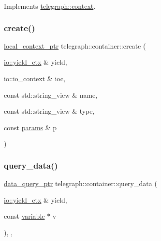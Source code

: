 Implements \hyperlink{classtelegraph_1_1context_a0798d49ea0874a870d4c980f6f09b6c2}{telegraph\+::context}.

\mbox{\label{classtelegraph_1_1container_a65eb3e80f805cbdb1c9335df40ff64ac}} 
\subsubsection{\texorpdfstring{create()}{create()}}
{\footnotesize\ttfamily \hyperlink{namespacetelegraph_ab59c7b38d99a98b4acc22433c920b1e6}{local\+\_\+context\+\_\+ptr} telegraph\+::container\+::create (\begin{DoxyParamCaption}\item[{\hyperlink{structboost_1_1asio_1_1yield__ctx}{io\+::yield\+\_\+ctx} \&}]{yield,  }\item[{io\+::io\+\_\+context \&}]{ioc,  }\item[{const std\+::string\+\_\+view \&}]{name,  }\item[{const std\+::string\+\_\+view \&}]{type,  }\item[{const \hyperlink{classtelegraph_1_1params}{params} \&}]{p }\end{DoxyParamCaption})\hspace{0.3cm}{\ttfamily [static]}}

\mbox{\label{classtelegraph_1_1container_a1a9849e53091061da81e7c1a73502e47}} 
\subsubsection{\texorpdfstring{query\+\_\+data()}{query\_data()}\hspace{0.1cm}{\footnotesize\ttfamily [1/2]}}
{\footnotesize\ttfamily \hyperlink{namespacetelegraph_a6ffe775ac48dca2a4013b53d692199c8}{data\+\_\+query\+\_\+ptr} telegraph\+::container\+::query\+\_\+data (\begin{DoxyParamCaption}\item[{\hyperlink{structboost_1_1asio_1_1yield__ctx}{io\+::yield\+\_\+ctx} \&}]{yield,  }\item[{const \hyperlink{classtelegraph_1_1variable}{variable} $\ast$}]{v }\end{DoxyParamCaption})\hspace{0.3cm}{\ttfamily [inline]}, {\ttfamily [override]}, {\ttfamily [virtual]}}



